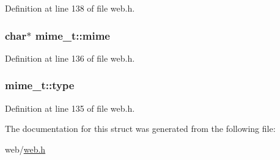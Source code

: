 Definition at line 138 of file web.\-h.

\hypertarget{structmime__t_ad796d16eaee60d7435bff66b2e9b8a8d}{
\subsubsection[{mime}]{\setlength{\rightskip}{0pt plus 5cm}char$\ast$ mime\-\_\-t\-::mime}}\label{structmime__t_ad796d16eaee60d7435bff66b2e9b8a8d}


Definition at line 136 of file web.\-h.

\hypertarget{structmime__t_ae69826dcfd475d65fa0fe8a1574bb3af}{
\subsubsection[{type}]{ mime\-\_\-t\-::type}}\label{structmime__t_ae69826dcfd475d65fa0fe8a1574bb3af}


Definition at line 135 of file web.\-h.



The documentation for this struct was generated from the following file\-:\begin{DoxyCompactItemize}
\item 
web/\hyperlink{web_8h}{web.\-h}\end{DoxyCompactItemize}
